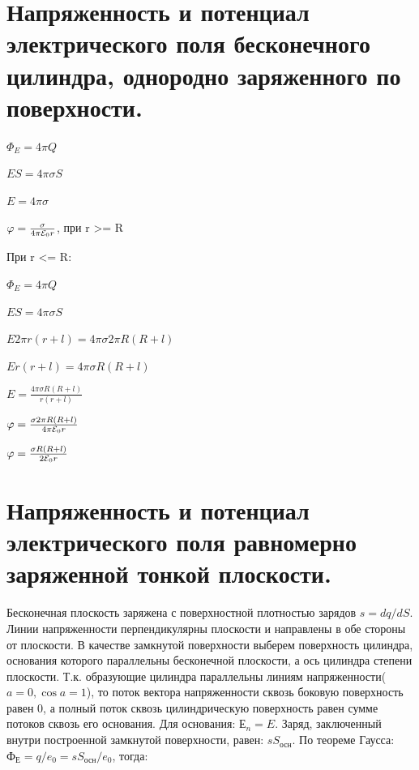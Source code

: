 \documentclass[12pt]{report}
\begin{document}
\section{Напряженность и потенциал электрического поля бесконечного цилиндра, однородно заряженного по поверхности.}
\begin{center}
    $ \Phi_E = 4\pi Q $
\end{center}
\begin{center}
    $ ES = 4 \pi \sigma S $
\end{center}
\begin{center}
    $E = 4 \pi \sigma $
\end{center}
\begin{center}
    $\varphi = \frac{\sigma}{4 \pi \varE_0 r}$, при r >= R
\end{center}
\begin{center}
    При r <= R:
\end{center}
\begin{center}
    $\Phi_E = 4 \pi Q$
\end{center}
\begin{center}
    $ES = 4 \pi \sigma S$
\end{center}
\begin{center}
    $E 2 \pi r(r + l) = 4 \pi \sigma 2 \pi R(R + l)$
\end{center}
\begin{center}
    $E  r(r + l) = 4 \pi \sigma  R(R + l)$
\end{center}
\begin{center}
    $E   = \frac{4 \pi \sigma  R(R + l)}{r(r + l)}$
\end{center}
\begin{center}
    $\varphi = \frac{\sigma 2 \pi R(R + l)}{4 \pi \varE_0 r} $
\end{center}
\begin{center}
    $\varphi = \frac{\sigma R(R + l)}{2 \varE_0 r} $
\end{center}
\section{Напряженность и потенциал электрического поля равномерно заряженной тонкой плоскости.}
Бесконечная плоскость заряжена с поверхностной плотностью зарядов $s=dq/dS$. Линии напряженности перпендикулярны плоскости и направлены в обе стороны от плоскости. В качестве замкнутой поверхности выберем поверхность цилиндра, основания которого параллельны бесконечной плоскости, а ось цилиндра степени плоскости.
Т.к. образующие цилиндра параллельны линиям напряженности( $a=0,\cos a=1$), то поток вектора напряженности сквозь боковую поверхность равен 0, а полный поток сквозь цилиндрическую поверхность равен сумме потоков сквозь его основания. Для основания: $Е_n = E$. Заряд, заключенный внутри построенной замкнутой поверхности, равен: $sS_\text{осн}$.
По теореме Гаусса: $Ф_Е =q/e_0 = sS_\text{осн}/e_0$, тогда:
\end{document}
